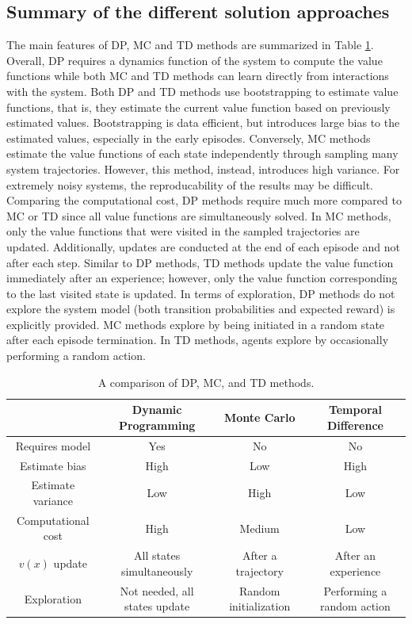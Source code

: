 \subsection{Summary of the different solution approaches}
The main features of DP, MC and TD methods are summarized in Table \ref{tab:dc_mc_td}. Overall, DP requires a dynamics function of the system to compute the value functions while both MC and TD methods can learn directly from interactions with the system. Both DP and TD methods use bootstrapping to estimate value functions, that is, they estimate the current value function based on previously estimated values. Bootstrapping is data efficient, but introduces large bias to the estimated values, especially in the early episodes.  Conversely, MC methods estimate the value functions of each state independently through sampling many system trajectories.  However, this method, instead, introduces high variance. For extremely noisy systems, the reproducability of the results may be difficult. Comparing the computational cost, DP methods require much more compared to MC or TD since all value functions are simultaneously solved. In MC methods, only the value functions that were visited in the sampled trajectories are updated.  Additionally, updates are conducted at the end of each episode and not after each step. Similar to DP methods, TD methods update the value function immediately after an experience; however, only the value function corresponding to the last visited state is updated. In terms of exploration, DP methods do not explore the system model (both transition probabilities and expected reward) is explicitly provided. MC methods explore by being initiated in a random state after each episode termination. In TD methods, agents explore by occasionally performing a random action.

\begin{table}[H]
\caption{A comparison of DP, MC, and TD methods.}
\label{tab:dc_mc_td}
\centering
{\scriptsize
\begin{tabular}{c|c|c|c}
 & \textbf{Dynamic Programming}	& \textbf{Monte Carlo} & \textbf{Temporal Difference}\\
\hline
Requires model	     	& Yes			& No     &  No \\
Estimate bias           & High			& Low    &  High \\
Estimate variance	    & Low			& High   &  Low \\
Computational cost		& High			& Medium &  Low \\
$v(x)$ update      	& All states simultaneously   & After a trajectory  &  After an experience \\
Exploration             & Not needed, all states update   & Random initialization  &  Performing a random action \\
\end{tabular}}
\end{table}

